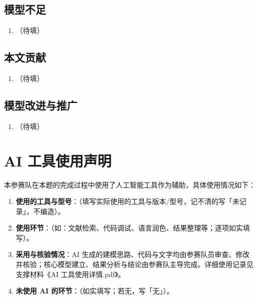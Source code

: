 \documentclass[withoutpreface,bwprint]{cumcmthesis}
\renewcommand{\textbf}[1]{{\song\bfseries #1}}
\begin{document}
\subsection{模型不足}

\begin{enumerate}
  \item （待填）
\end{enumerate}

\subsection{本文贡献}

\begin{enumerate}
  \item （待填）
\end{enumerate}

\subsection{模型改进与推广}

\begin{enumerate}
  \item （待填）
\end{enumerate}

\section*{AI 工具使用声明}

本参赛队在本题的完成过程中使用了人工智能工具作为辅助，具体使用情况如下：

\begin{enumerate}
  \item \textbf{使用的工具与型号}：（填写实际使用的工具与版本/型号，记不清的写「未记录」，不编造）。
  \item \textbf{使用环节}：（如：文献检索、代码调试、语言润色、结果整理等；逐项如实填写）。
  \item \textbf{采用与核验情况}：AI 生成的建模思路、代码与文字均由参赛队员审查、修改并核验；核心模型建立、结果分析与结论由参赛队主导完成。详细使用记录见支撑材料《AI 工具使用详情.pdf》。
  \item \textbf{未使用 AI 的环节}：（如实填写；若无，写「无」）。
\end{enumerate}
\end{document}
